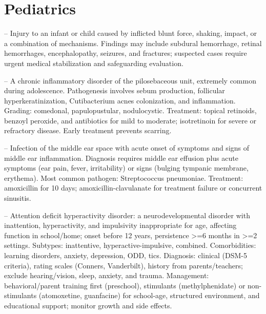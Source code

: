 \chapter{Pediatrics}

-- Injury to an infant or child caused by inflicted blunt force, shaking, impact, or a combination of mechanisms. Findings may include subdural hemorrhage, retinal hemorrhages, encephalopathy, seizures, and fractures; suspected cases require urgent medical stabilization and safeguarding evaluation.

-- A chronic inflammatory disorder of the pilosebaceous unit, extremely common during adolescence. Pathogenesis involves sebum production, follicular hyperkeratinization, Cutibacterium acnes colonization, and inflammation. Grading: comedonal, papulopustular, nodulocystic. Treatment: topical retinoids, benzoyl peroxide, and antibiotics for mild to moderate; isotretinoin for severe or refractory disease. Early treatment prevents scarring.

-- Infection of the middle ear space with acute onset of symptoms and signs of middle ear inflammation. Diagnosis requires middle ear effusion plus acute symptoms (ear pain, fever, irritability) or signs (bulging tympanic membrane, erythema). Most common pathogen: Streptococcus pneumoniae. Treatment: amoxicillin for 10 days; amoxicillin-clavulanate for treatment failure or concurrent sinusitis.

-- Attention deficit hyperactivity disorder: a neurodevelopmental disorder with inattention, hyperactivity, and impulsivity inappropriate for age, affecting function in school/home; onset before 12 years, persistence >=6 months in >=2 settings. Subtypes: inattentive, hyperactive-impulsive, combined. Comorbidities: learning disorders, anxiety, depression, ODD, tics. Diagnosis: clinical (DSM-5 criteria), rating scales (Conners, Vanderbilt), history from parents/teachers; exclude hearing/vision, sleep, anxiety, and trauma. Management: behavioral/parent training first (preschool), stimulants (methylphenidate) or non-stimulants (atomoxetine, guanfacine) for school-age, structured environment, and educational support; monitor growth and side effects.

